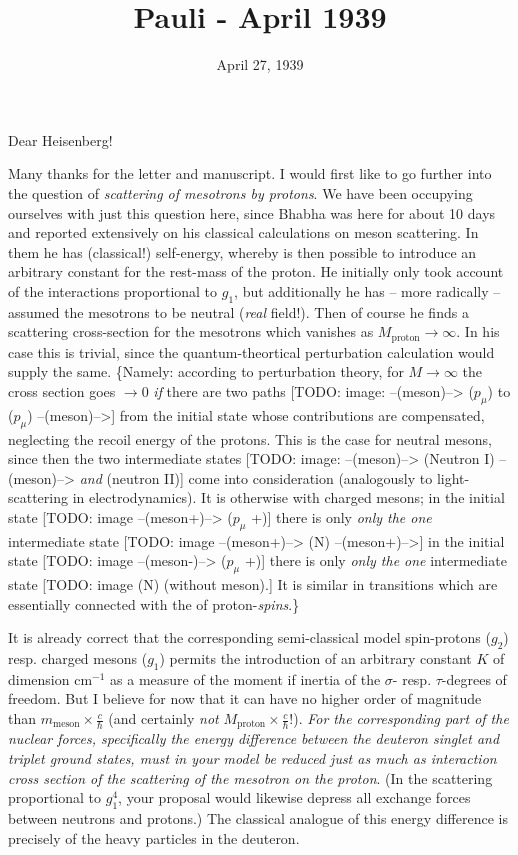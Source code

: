\documentclass{article}
\title{Pauli - April 1939}
\begin{document}
\date{April 27, 1939}

Dear Heisenberg!

Many thanks for the letter and manuscript. I would first like to go further into the question of \textit{scattering of mesotrons by protons}. We have been occupying ourselves with just this question here, since Bhabha was here for about 10 days and reported extensively on his classical calculations on meson scattering. In them he has  (classical!) self-energy, whereby is then possible to introduce an arbitrary constant for the rest-mass of the proton. He initially only took account of the interactions proportional to $g_1$, but additionally he has -- more radically -- assumed the mesotrons to be neutral (\textit{real} field!). Then of course he finds a scattering cross-section for the mesotrons which vanishes as $M_\text{proton} \to \infty$. In his case this is trivial, since the quantum-theortical perturbation calculation would supply the same. \{Namely: according to perturbation theory, for $M \to \infty$ the cross section goes $\to 0$ \textit{if} there are two paths 
[TODO: image: --(meson)--> ($p_\mu$) to ($p_\mu$) --(meson)-->]
from the initial state whose contributions are compensated, neglecting the recoil energy of the protons. This is the case for neutral mesons, since then the two intermediate states
[TODO: image: --(meson)--> (Neutron I) --(meson)--> \textit{and} (neutron II)]
come into consideration (analogously to light-scattering in electrodynamics). It is otherwise with charged mesons; in the initial state
[TODO: image --(meson+)--> ($p_\mu$ +)]
 there is only \textit{only the one} intermediate state
[TODO: image --(meson+)--> (N) --(meson+)-->]
in the initial state
[TODO: image --(meson-)--> ($p_\mu$ +)]
 there is only \textit{only the one} intermediate state
[TODO: image (N) (without meson).]
It is similar in transitions which are essentially connected with the  of proton-\textit{spins}.\}

It is already correct that the corresponding semi-classical model spin-protons ($g_2$) resp. charged mesons ($g_1$) permits the introduction of an arbitrary constant $K$ of dimension $\text{cm}^{-1}$ as a measure of the moment if inertia of the $\sigma$- resp. $\tau$-degrees of freedom. But I believe for now that it can have no higher order of magnitude than $m_\text{meson}\times\frac{c}{\hbar}$ (and certainly \textit{not} $M_\text{proton}\times\frac{c}{\hbar}$!). \textit{For the corresponding part of the nuclear forces, specifically the energy difference between the deuteron singlet and triplet ground states, must in your model be reduced just as much as interaction cross section of the scattering of the mesotron on the proton}. (In the scattering proportional to $g^4_1$, your proposal would likewise depress all exchange forces between neutrons and protons.) The classical analogue of this energy difference is precisely  of the heavy particles in the deuteron.
\end{document}
